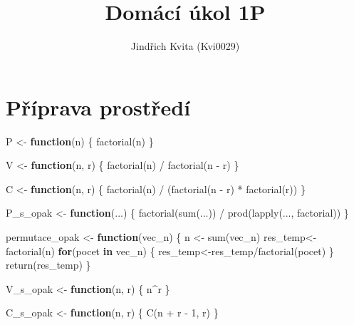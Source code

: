 \documentclass[
]{scrreprt}
\title{Domácí úkol 1P}
\author{Jindřich Kvita (Kvi0029)}
\date{}
\newenvironment{Shaded}{\begin{snugshade}}{\end{snugshade}}
\newcommand{\ControlFlowTok}[1]{\textcolor[rgb]{0.13,0.29,0.53}{\textbf{#1}}}
\newcommand{\DecValTok}[1]{\textcolor[rgb]{0.00,0.00,0.81}{#1}}
\newcommand{\FunctionTok}[1]{\textcolor[rgb]{0.00,0.00,0.00}{#1}}
\newcommand{\NormalTok}[1]{#1}
\newcommand{\OtherTok}[1]{\textcolor[rgb]{0.56,0.35,0.01}{#1}}
\newcommand{\SpecialCharTok}[1]{\textcolor[rgb]{0.00,0.00,0.00}{#1}}
\begin{document}
\maketitle

\hypertarget{pux159uxedprava-prostux159eduxed}{%
\chapter{Příprava prostředí}\label{pux159uxedprava-prostux159eduxed}}

\begin{Shaded}
\begin{Highlighting}[]
\NormalTok{P }\OtherTok{\textless{}{-}} \ControlFlowTok{function}\NormalTok{(n) \{}
  \FunctionTok{factorial}\NormalTok{(n)}
\NormalTok{\}}

\NormalTok{V }\OtherTok{\textless{}{-}} \ControlFlowTok{function}\NormalTok{(n, r) \{}
  \FunctionTok{factorial}\NormalTok{(n) }\SpecialCharTok{/} \FunctionTok{factorial}\NormalTok{(n }\SpecialCharTok{{-}}\NormalTok{ r)}
\NormalTok{\}}

\NormalTok{C }\OtherTok{\textless{}{-}} \ControlFlowTok{function}\NormalTok{(n, r) \{}
  \FunctionTok{factorial}\NormalTok{(n) }\SpecialCharTok{/}\NormalTok{ (}\FunctionTok{factorial}\NormalTok{(n }\SpecialCharTok{{-}}\NormalTok{ r) }\SpecialCharTok{*} \FunctionTok{factorial}\NormalTok{(r))}
\NormalTok{\}}

\NormalTok{P\_s\_opak }\OtherTok{\textless{}{-}} \ControlFlowTok{function}\NormalTok{(...) \{}
  \FunctionTok{factorial}\NormalTok{(}\FunctionTok{sum}\NormalTok{(...)) }\SpecialCharTok{/} \FunctionTok{prod}\NormalTok{(}\FunctionTok{lapply}\NormalTok{(..., factorial))}
\NormalTok{\}}

\NormalTok{permutace\_opak }\OtherTok{\textless{}{-}} \ControlFlowTok{function}\NormalTok{(vec\_n) \{}
\NormalTok{  n }\OtherTok{\textless{}{-}} \FunctionTok{sum}\NormalTok{(vec\_n)}
\NormalTok{  res\_temp}\OtherTok{\textless{}{-}}\FunctionTok{factorial}\NormalTok{(n)}
  \ControlFlowTok{for}\NormalTok{(pocet }\ControlFlowTok{in}\NormalTok{ vec\_n) \{}
\NormalTok{    res\_temp}\OtherTok{\textless{}{-}}\NormalTok{res\_temp}\SpecialCharTok{/}\FunctionTok{factorial}\NormalTok{(pocet)}
\NormalTok{  \}}
  \FunctionTok{return}\NormalTok{(res\_temp)}
\NormalTok{\}}

\NormalTok{V\_s\_opak }\OtherTok{\textless{}{-}} \ControlFlowTok{function}\NormalTok{(n, r) \{}
\NormalTok{  n}\SpecialCharTok{\^{}}\NormalTok{r}
\NormalTok{\}}

\NormalTok{C\_s\_opak }\OtherTok{\textless{}{-}} \ControlFlowTok{function}\NormalTok{(n, r) \{}
  \FunctionTok{C}\NormalTok{(n }\SpecialCharTok{+}\NormalTok{ r }\SpecialCharTok{{-}} \DecValTok{1}\NormalTok{, r)}
\NormalTok{\}}
\end{Highlighting}
\end{Shaded}
\end{document}
